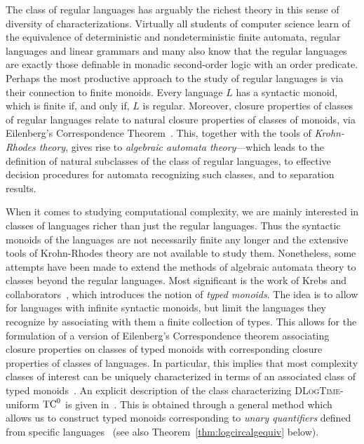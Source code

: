 \documentclass[a4paper,UKenglish,cleveref, autoref, thm-restate, anonymous]{lipics-v2021}
\begin{document}
The class of regular languages has arguably the richest theory in this sense of diversity of characterizations.  Virtually all students of computer science learn of the equivalence of deterministic and nondeterministic finite automata, regular languages and linear grammars and many also know that the regular languages are exactly those definable in monadic second-order logic with an order predicate.  Perhaps the most productive approach to the study of regular languages is via their connection to finite monoids.  Every language $L$ has a syntactic monoid, which is finite if, and only if, $L$ is regular.  Moreover, closure properties of classes of regular languages relate to natural closure properties of classes of monoids, via Eilenberg's Correspondence Theorem~\cite{eilenberg1976automata}.  This, together with the tools of  \emph{Krohn-Rhodes theory}, gives rise to \emph{algebraic automata theory}---which leads to the definition of natural subclasses of the class of regular languages, to effective decision procedures for automata recognizing such classes, and to separation results.

When it comes to studying computational complexity, we are mainly interested in classes of languages richer than just the regular languages.  Thus the syntactic monoids of the languages are not necessarily finite any longer and the extensive tools of Krohn-Rhodes theory are not available to study them.  Nonetheless, some attempts have been made to extend the methods of algebraic automata theory to classes beyond the regular languages.  Most significant is the work of Krebs and collaborators~\cite{behle2007linear,behle2011typed,krebs2007characterizing,krebs2008typed,cano2021positive}, which introduces the notion of \emph{typed monoids}.  The idea is to allow for languages with infinite syntactic monoids, but limit the languages they recognize by associating with them a finite collection of types.  This allows for the formulation of a version of Eilenberg's Correspondence theorem associating closure properties on classes of typed monoids with corresponding closure properties of classes of languages.  In particular, this implies that most complexity classes of interest can be uniquely characterized in terms of an associated class of typed monoids~\cite{behle2011typed}.  An explicit description of the class characterizing \textsc{DLogTime}-uniform $\mathrm{TC}^0$ is given in~\cite{krebs2007characterizing,krebs2008typed}.  This is obtained through a general method which allows us to construct typed monoids corresponding to \emph{unary quantifiers} defined from specific languages~\cite{krebs2008typed} (see also Theorem~\ref{thm:logcircalgequiv} below).
\end{document}
